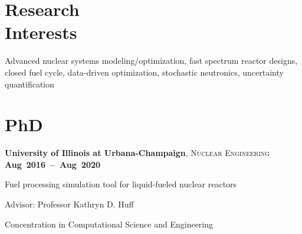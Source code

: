\documentclass[margin,line]{resume}
\begin{document}
\begin{resume}
    \section{\mysidestyle Research\\Interests}
		Advanced nuclear systems modeling/optimization, fast spectrum reactor designs, closed fuel cycle, 	       data-driven optimization, stochastic neutronics, uncertainty quantification
    \section{\mysidestyle PhD}
    \textbf{University of Illinois at Urbana-Champaign}, \textsc{Nuclear 
    Engineering} \hfill\textbf{\mbox{Aug 2016 -- Aug 
    2020}}\vspace{-3mm}\\\vspace{-1mm}%
    \begin{list2}
        \item Fuel processing simulation tool for liquid-fueled nuclear reactors
        \item Advisor:  Professor Kathryn D. Huff
        \item Concentration in Computational Science and Engineering
    \end{list2}\vspace{-1.5mm}

\end{resume}
\end{document}
